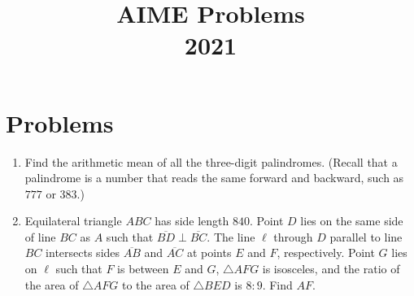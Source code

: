\documentclass{article}
\title{AIME Problems \\ 2021}
\date{}
\begin{document}
\maketitle\thispagestyle{fancy}\newpage\section*{Problems}\begin{enumerate}[label=\arabic*., itemsep=0.5em]\item Find the arithmetic mean of all the three-digit palindromes. (Recall that a palindrome is a number that reads the same forward and backward, such as $777$ or $383$.)\par \vspace{0.5em}\item Equilateral triangle $ABC$ has side length $840$. Point $D$ lies on the same side of line $BC$ as $A$ such that $\overline{BD} \perp \overline{BC}$. The line $\ell$ through $D$ parallel to line $BC$ intersects sides $\overline{AB}$ and $\overline{AC}$ at points $E$ and $F$, respectively. Point $G$ lies on $\ell$ such that $F$ is between $E$ and $G$, $\triangle AFG$ is isosceles, and the ratio of the area of $\triangle AFG$ to the area of $\triangle BED$ is $8:9$. Find $AF$.


\end{enumerate}
\end{document}
